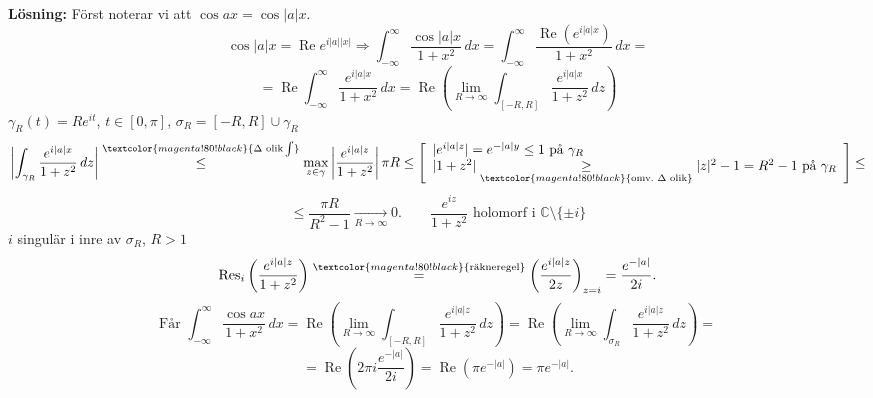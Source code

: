 \textbf{Lösning:} Först noterar vi att $\cos ax = \cos|a|x$.
\[ \cos|a|x = \operatorname{Re} e^{i|a||x|} \Rightarrow \int_{-\infty}^\infty \frac{\cos|a|x}{1 + x^2}\,dx = \int_{-\infty}^\infty \frac{\operatorname{Re}(e^{i|a|x})}{1 + x^2}\,dx = \]
\[ = \operatorname{Re} \int_{-\infty}^\infty \frac{e^{i|a|x}}{1 + x^2}\,dx = \operatorname{Re}\left( \lim_{R \to \infty} \int_{[-R, R]} \frac{e^{i|a|x}}{1 + z^2}\,dz \right) \]
$\gamma_R(t) = Re^{it}$, $t \in [0, \pi]$, \quad $\sigma_R = [-R, R] \cup \gamma_R$
\[ \left| \int_{\gamma_R} \frac{e^{i|a|x}}{1 + z^2}\,dz \right| \overset{\textcolor{magenta!80!black}{\Delta \text{ olik} \int}}{\le} \max_{z \in \gamma} \left| \frac{e^{i|a|z}}{1 + z^2} \right| \pi R \le \left[ \begin{array}{l} |e^{i|a|z}| = e^{-|a|y} \le 1 \text{ på } \gamma_R \\ |1 + z^2| \underset{\textcolor{magenta!80!black}{\text{omv.\ } \Delta \text{ olik}}}{\ge} |z|^2 - 1 = R^2 - 1 \text{ på } \gamma_R \end{array} \right] \le \]
\[ \le \frac{\pi R}{R^2 - 1} \xrightarrow[R \to \infty]{} 0. \qquad \frac{e^{iz}}{1 + z^2} \text{ holomorf i } \mathbb{C} \setminus \{\pm i\} \]
$i$ singulär i inre av $\sigma_R$, $R > 1$
\[ \operatorname{Res}_i\left( \frac{e^{i|a|z}}{1 + z^2} \right) \overset{\textcolor{magenta!80!black}{\text{räkneregel}}}{=} \left( \frac{e^{i|a|z}}{2z} \right)_{z = i} = \frac{e^{-|a|}}{2i}. \]
\[ \text{Får } \int_{-\infty}^\infty \frac{\cos ax}{1 + x^2}\,dx = \operatorname{Re}\left( \lim_{R \to \infty} \int_{[-R, R]} \frac{e^{i|a|z}}{1 + z^2}\,dz \right) = \operatorname{Re}\left( \lim_{R \to \infty} \int_{\sigma_R} \frac{e^{i|a|z}}{1 + z^2}\,dz \right) = \]
\[ = \operatorname{Re}\left( 2\pi i \frac{e^{-|a|}}{2i} \right) = \operatorname{Re}(\pi e^{-|a|}) = \pi e^{-|a|}. \]
